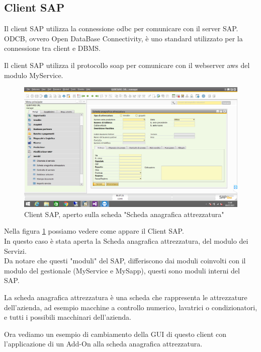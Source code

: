 \subsection{Client SAP}
\begin{flushleft}
	\item Il client SAP utilizza la connessione \gls{odbc} per comunicare con il server SAP.\\ODCB, ovvero Open DataBase Connectivity, è uno standard utilizzato per la connessione tra client e DBMS. 
	\item Il client SAP utilizza il protocollo \gls{soap} per comunicare con il webserver \gls{aws} del modulo MyService.
\end{flushleft}
\begin{figure}[!h] 
	\centering 
	\includegraphics[scale = 0.4]{immagini/client-sap.png} 
	\caption {Client SAP, aperto sulla scheda "Scheda anagrafica attrezzatura"}
	\label{fig:2-4}
\end{figure}
\begin{flushleft}
	\item Nella figura \ref{fig:2-4} possiamo vedere come appare il Client SAP.\\In questo caso è stata aperta la Scheda anagrafica attrezzatura, del modulo dei Servizi.\\Da notare che questi "moduli" del SAP, differiscono dai moduli coinvolti con il modulo del gestionale (MyService e MySapp), questi sono moduli interni del SAP.
	\item La scheda anagrafica attrezzatura è una scheda che rappresenta le attrezzature dell'azienda, ad esempio macchine a controllo numerico, lavatrici o condizionatori, e tutti i possibili macchinari dell'azienda.
	\item Ora vediamo un esempio di cambiamento della GUI di questo client con l'applicazione di un Add-On alla scheda anagrafica attrezzatura.
\end{flushleft}
